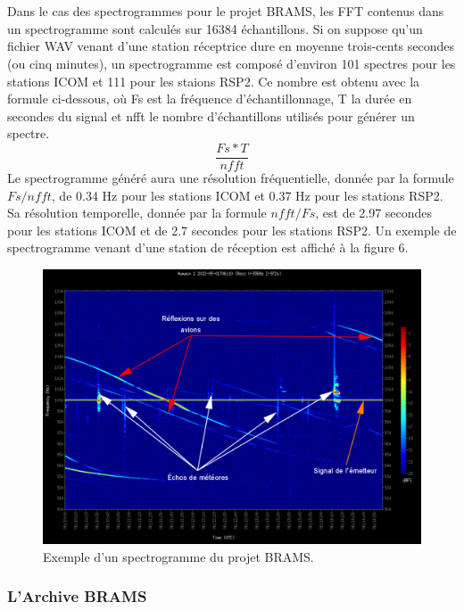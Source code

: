 \documentclass[11pt]{article}
\begin{document}
\\
\\
Dans le cas des spectrogrammes pour le projet BRAMS, les FFT contenus dans un spectrogramme sont calculés sur 16384 échantillons.
Si on suppose qu'un fichier WAV venant d'une station réceptrice dure en moyenne trois-cents secondes (ou cinq minutes), un spectrogramme est composé d'environ 101 spectres pour les stations ICOM et 111 pour les staions RSP2.
Ce nombre est obtenu avec la formule ci-dessous, où Fs est la fréquence d'échantillonnage, T la durée en secondes du signal et nfft le nombre d'échantillons utilisés pour générer un spectre.
\[\frac{Fs * T}{nfft}\]
Le spectrogramme généré aura une résolution fréquentielle, donnée par la formule \(Fs / nfft\), de 0.34 Hz pour les stations ICOM et 0.37 Hz pour les stations RSP2.
Sa résolution temporelle, donnée par la formule \(nfft / Fs\), est de 2.97 secondes pour les stations ICOM et de 2.7 secondes pour les stations RSP2.
Un exemple de spectrogramme venant d'une station de réception est affiché à la figure 6.

\begin{figure}[t]
    \begin{center}
        \includegraphics[scale=0.29]{spectrogramme_legend.png}
        \caption{Exemple d'un spectrogramme du projet BRAMS.}
    \end{center}
\end{figure}

\subsubsection{L'Archive BRAMS}
\end{document}
